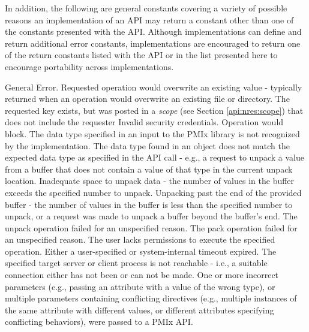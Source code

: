 In addition, the following are general constants covering a variety of possible reasons an implementation of an \ac{API} may return a constant other than one of the constants presented with the \ac{API}.  Although implementations can define and return additional error constants, implementations are encouraged to return one of the return constants listed with the \ac{API} or in the list presented here to encourage portability across implementations. 

\begin{constantdesc}
%
General Error.
%
Requested operation would overwrite an existing value - typically returned
when an operation would overwrite an existing file or directory.
%
The requested key exists, but was posted in a \emph{scope} (see Section \ref{api:nres:scope}) that does not include the requester
%
Invalid security credentials.
%
Operation would block.
%
The data type specified in an input to the \ac{PMIx} library is not recognized
by the implementation.
%
The data type found in an object does not match the expected data type
as specified in the \ac{API} call - e.g., a request to unpack a
 value from a buffer that does not contain a value of
that type in the current unpack location.
%
Inadequate space to unpack data - the number of values in the buffer exceeds
the specified number to unpack.
%
Unpacking past the end of the provided buffer - the number of values in the
buffer is less than the specified number to unpack, or a request was made to
unpack a buffer beyond the buffer's end.
%
The unpack operation failed for an unspecified reason.
%
The pack operation failed for an unspecified reason.
%
The user lacks permissions to execute the specified operation.
%
Either a user-specified or system-internal timeout expired.
%
The specified target server or client process is not reachable - i.e., a
suitable connection either has not been or can not be made.
%
One or more incorrect parameters (e.g., passing an attribute with a value of the wrong type), or multiple parameters containing conflicting directives (e.g., multiple instances of the same attribute with different values, or different attributes specifying conflicting behaviors), were passed to a \ac{PMIx} \ac{API}.

\end{constantdesc}
